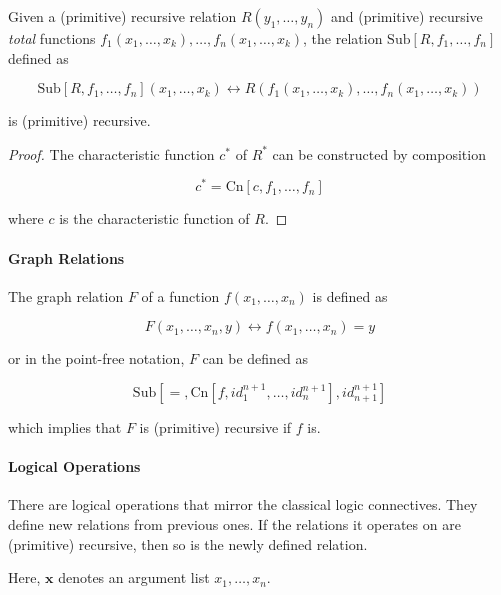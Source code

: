 Given a (primitive) recursive relation $R(y_1, \ldots, y_n)$ and (primitive) 
recursive \textit{total} functions $f_1(x_1, \ldots, x_k), \ldots, f_n(x_1, 
\ldots, x_k)$, the relation $\mathrm{Sub}[R, f_1, \ldots, f_n]$ defined as

$$
\mathrm{Sub}[R, f_1, \ldots, f_n](x_1, \ldots, x_k) 
\leftrightarrow
R(f_1(x_1, \ldots, x_k), \ldots, f_n(x_1, \ldots, x_k))
$$

is (primitive) recursive.

\begin{proof}
The characteristic function $c^*$ of $R^*$ can be constructed by composition

$$c^* = \mathrm{Cn}[c, f_1, \ldots, f_n]$$

where $c$ is the characteristic function of $R$.
\end{proof}

\paragraph{Graph Relations}

The graph relation $F$ of a function $f(x_1, \ldots, x_n)$ is defined as

$$
F(x_1, \ldots, x_n, y)
\leftrightarrow
f(x_1, \ldots, x_n) = y
$$

or in the point-free notation, $F$ can be defined as

$$
\mathrm{Sub}[=, \mathrm{Cn}[f, id^{n+1}_1, \ldots, id^{n+1}_n], id^{n+1}_{n+1}]
$$

which implies that $F$ is (primitive) recursive if $f$ is.

\paragraph{Logical Operations}

There are logical operations that mirror the classical logic connectives. They
define new relations from previous ones. If the relations it operates on are 
(primitive) recursive, then so is the newly defined relation.

Here, $\mathbf{x}$ denotes an argument list $x_1, \ldots, x_n$.

